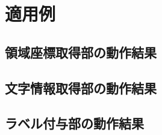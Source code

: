 \chapter{適用例}\label{cha:Indication}




\section{領域座標取得部の動作結果}\label{sec:result_area_coords_obtainment}


\section{文字情報取得部の動作結果}\label{sec:result_OCR}


\section{ラベル付与部の動作結果}\label{sec:result_area_labeling}
